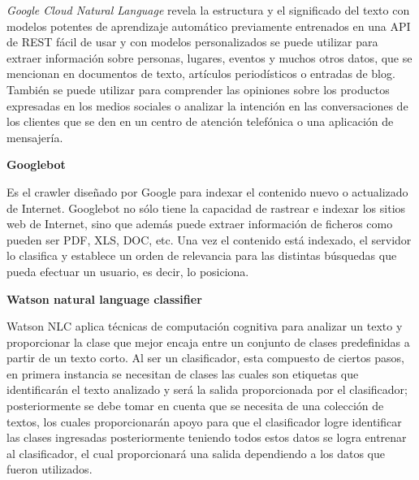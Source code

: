 \textit{Google Cloud Natural Language} \citep{CD12}   revela la estructura y el significado del texto con modelos potentes de aprendizaje automático previamente entrenados en una API de REST fácil de usar y con modelos personalizados se puede utilizar para extraer información sobre personas, lugares, eventos y muchos otros datos, que se mencionan en documentos de texto, artículos periodísticos o entradas de blog. También se puede utilizar para comprender las opiniones sobre los productos expresadas en los medios sociales o analizar la intención en las conversaciones de los clientes que se den en un centro de atención telefónica o una aplicación de mensajería.\\

\begin{large}
	 \textbf{Googlebot}\\
\end{large}

Es el crawler diseñado por Google para indexar el contenido nuevo o actualizado de Internet.
Googlebot \citep{CD13} no sólo tiene la capacidad de rastrear e indexar los sitios web de Internet, sino que además puede extraer información de ficheros como pueden ser PDF, XLS, DOC, etc.
Una vez el contenido está indexado, el servidor lo clasifica y establece un orden de relevancia para las distintas búsquedas que pueda efectuar un usuario, es decir, lo posiciona.\\



\begin{large}
	 \textbf{Watson natural language classifier}\\
\end{large}

Watson NLC \citep{CD14} aplica técnicas de computación cognitiva para analizar un texto y proporcionar la clase que mejor encaja entre un conjunto de clases predefinidas a partir de un texto corto.
Al ser un clasificador, esta compuesto de ciertos pasos, en primera instancia se necesitan de clases las cuales son etiquetas que identificarán el texto analizado y será la salida proporcionada por el clasificador; posteriormente se debe tomar en cuenta que se necesita de una colección de textos, los cuales proporcionarán apoyo para que el clasificador logre identificar las clases ingresadas posteriormente teniendo todos estos datos se logra entrenar al clasificador, el cual proporcionará una salida dependiendo a los datos que fueron utilizados.


